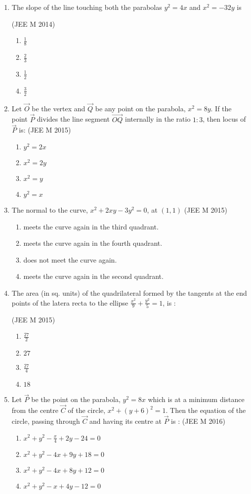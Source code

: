 \documentclass[journal,12pt,twocolumn]{IEEEtran}
\theoremstyle{remark}
\begin{document}
\begin{enumerate}
    \item The slope of the line touching both the parabolas $y^2=4x$ and $x^2=-32y$ is

    \hfill(JEE M 2014)
    \begin{enumerate}
    \item$\frac{1}{8}$
    \item$\frac{2}{3}$
    \item$\frac{1}{2}$
    \item$\frac{3}{2}$ 
    \end{enumerate}

    \item Let $\vec{O}$ be the vertex and $\vec{Q}$ be any point on the parabola, $x^2=8y$. If the point $\vec{P}$ divides the line segment $\vec{OQ}$ internally in the ratio $1:3$, then locus of $\vec{P}$ is:
    \hfill(JEE M 2015)
    \begin{enumerate}
    \item$y^2=2x$
    \item$x^2=2y$
    \item$x^2=y$
    \item$y^2=x$ 
    \end{enumerate}

    \item The normal to the curve, $x^2+2xy-3y^2=0$, at $(1,1)$
    \hfill(JEE M 2015)
    \begin{enumerate}
    \item meets the curve again in the third quadrant.
    \item meets the curve again in the fourth quadrant.
    \item does not meet the curve again.
    \item meets the curve again in the second quadrant.
    \end{enumerate}
    \item The area (in sq. units) of the quadrilateral formed by the tangents at the end points of the latera recta to the ellipse $\frac{x^2}{9}+\frac{y^2}{5}=1$, is :
    
    \hfill(JEE M 2015)
    \begin{enumerate}
    \item$\frac{27}{2}$
    \item$27$
    \item$\frac{27}{4}$
    \item$18$ 
    \end{enumerate}

    \item Let $\vec{P}$ be the point on the parabola, $y^2=8x$ which is at a minimum distance from the centre $\vec{C}$ of the circle, $x^2+(y+6)^2=1$. Then the equation of the circle, passing through $\vec{C}$ and having its centre at $\vec{P}$ is :
    \hfill(JEE M 2016)
    \begin{enumerate}
    \item $x^2+y^2-\frac{x}{4}+2y-24=0$
    \item $x^2+y^2-4x+9y+18=0$
    \item $x^2+y^2-4x+8y+12=0$
    \item $x^2+y^2-x+4y-12=0$
    \end{enumerate}
    

\end{enumerate}
\end{document}
